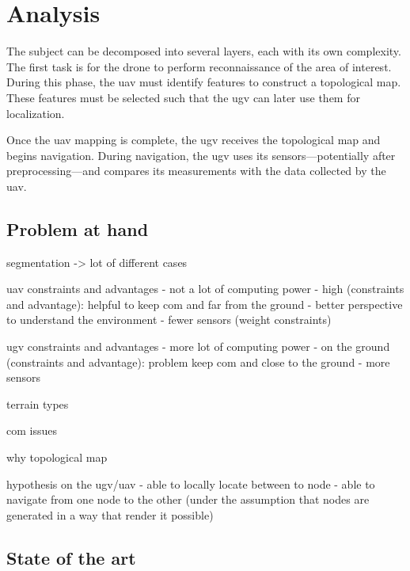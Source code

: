 \chapter{Analysis}\label{ch:analysis}

The subject can be decomposed into several layers, each with its own complexity.
The first task is for the drone to perform reconnaissance of the area of interest.
During this phase, the \gls{uav} must identify features to construct a topological map.
These features must be selected such that the \gls{ugv} can later use them for localization.

Once the \gls{uav} mapping is complete, the \gls{ugv} receives the topological map and begins navigation.
During navigation, the \gls{ugv} uses its sensors—potentially after preprocessing—and compares its measurements with the data collected by the \gls{uav}.


\section{Problem at hand}\label{sec:problem-at-hand}

segmentation -> lot of different cases

uav constraints and advantages
- not a lot of computing power
- high (constraints and advantage): helpful to keep com and far from the ground
- better perspective to understand the environment
- fewer sensors (weight constraints)

ugv constraints and advantages
- more lot of computing power
- on the ground (constraints and advantage): problem keep com and close to the ground
- more sensors


terrain types

com issues

why topological map

hypothesis on the ugv/uav
- able to locally locate between to node
- able to navigate from one node to the other (under the assumption that nodes are generated in a way that render it possible)


\section{State of the art}\label{sec:state-of-the-art}


